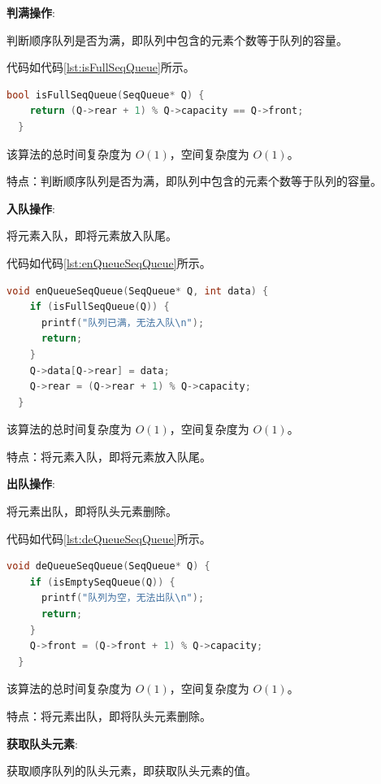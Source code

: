 \documentclass[lang=cn,newtx,10pt,scheme=chinese]{elegantbook}
\begin{document}
\textbf{判满操作}:

判断顺序队列是否为满，即队列中包含的元素个数等于队列的容量。

代码如代码\ref{lst:isFullSeqQueue}所示。

\begin{lstlisting}[language=C++, caption={判断顺序队列是否为满示例代码}, label={lst:isFullSeqQueue}]
  bool isFullSeqQueue(SeqQueue* Q) {
    return (Q->rear + 1) % Q->capacity == Q->front;
  }

\end{lstlisting}

该算法的总时间复杂度为 $O(1)$，空间复杂度为 $O(1)$。

特点：判断顺序队列是否为满，即队列中包含的元素个数等于队列的容量。

\textbf{入队操作}:

将元素入队，即将元素放入队尾。

代码如代码\ref{lst:enQueueSeqQueue}所示。

\begin{lstlisting}[language=C++, caption={入队示例代码}, label={lst:enQueueSeqQueue}]
  void enQueueSeqQueue(SeqQueue* Q, int data) {
    if (isFullSeqQueue(Q)) {
      printf("队列已满，无法入队\n");
      return;
    }
    Q->data[Q->rear] = data;
    Q->rear = (Q->rear + 1) % Q->capacity;
  }

\end{lstlisting}

该算法的总时间复杂度为 $O(1)$，空间复杂度为 $O(1)$。

特点：将元素入队，即将元素放入队尾。

\textbf{出队操作}:

将元素出队，即将队头元素删除。

代码如代码\ref{lst:deQueueSeqQueue}所示。

\begin{lstlisting}[language=C++, caption={出队示例代码}, label={lst:deQueueSeqQueue}]
  void deQueueSeqQueue(SeqQueue* Q) {
    if (isEmptySeqQueue(Q)) {
      printf("队列为空，无法出队\n");
      return;
    }
    Q->front = (Q->front + 1) % Q->capacity;
  }

\end{lstlisting}

该算法的总时间复杂度为 $O(1)$，空间复杂度为 $O(1)$。

特点：将元素出队，即将队头元素删除。

\textbf{获取队头元素}:

获取顺序队列的队头元素，即获取队头元素的值。
\end{document}
